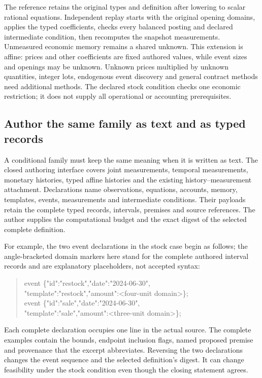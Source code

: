 The reference retains the original types and definition after lowering to
scalar rational equations. Independent replay starts with the original opening
domains, applies the typed coefficients, checks every balanced posting and
declared intermediate condition, then recomputes the snapshot measurements.
Unmeasured economic memory remains a shared unknown. This extension is affine:
prices and other coefficients are fixed authored values, while event sizes and
openings may be unknown. Unknown prices multiplied by unknown quantities,
integer lots, endogenous event discovery and general contract methods need
additional methods. The declared stock condition checks one economic
restriction; it does not supply all operational or accounting prerequisites.



\subsection{Author the same family as text and as typed records}

A conditional family must keep the same meaning when it is written as text.
The closed  authoring interface covers joint
measurements, temporal measurements, monetary histories, typed affine histories
and the existing history--measurement attachment. Declarations name observations,
equations, accounts, memory, templates, events, measurements and intermediate
conditions. Their payloads retain the complete typed records, intervals,
premises and source references. The author supplies the computational budget
and the exact digest of the selected complete definition.

For example, the two event declarations in the stock case begin as follows;
the angle-bracketed domain markers here stand for the complete authored interval
records and are explanatory placeholders, not accepted syntax:
\begin{quote}\small\ttfamily
event \{"id":"restock","date":"2024-06-30",\\
\hspace*{1em}"template":"restock","amount":<four-unit domain>\};\\
event \{"id":"sale","date":"2024-06-30",\\
\hspace*{1em}"template":"sale","amount":<three-unit domain>\};
\end{quote}
Each complete declaration occupies one line in the actual source. The complete
examples contain the bounds, endpoint inclusion flags, named proposed premise
and provenance that the excerpt abbreviates. Reversing the two declarations
changes the event sequence and the selected definition's digest. It can change
feasibility under the stock condition even though the closing statement agrees.

